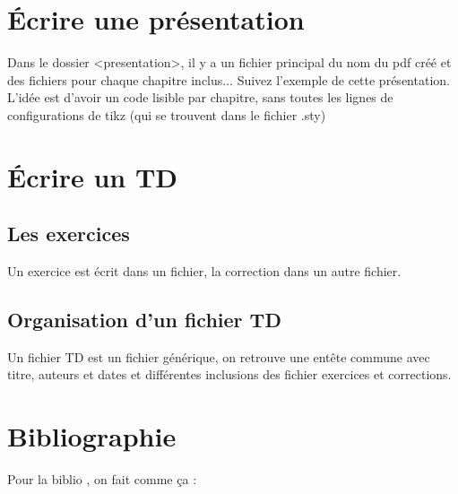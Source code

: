 \documentclass[./beamerCoursIsenLaTeX.tex]{subfiles}
\begin{document}
\section{Écrire une présentation}
\begin{frame}
 Dans le dossier <presentation>, il y a un fichier principal du nom du pdf créé et des fichiers pour chaque chapitre inclus... Suivez l'exemple de cette présentation. L'idée est d'avoir un code lisible par chapitre, sans toutes les lignes de configurations de tikz (qui se trouvent dans le fichier .sty)
\end{frame}
\section{Écrire un TD}
\subsection{Les exercices}
\begin{frame}
 Un exercice est écrit dans un fichier, la correction dans un autre fichier.
\end{frame}
\subsection{Organisation d'un fichier TD}
\begin{frame}
 Un fichier TD est un fichier générique, on retrouve une entête commune avec titre, auteurs et dates et différentes inclusions des fichier exercices et corrections.
\end{frame}
\section{Bibliographie}
\begin{frame}
 Pour la biblio \cite{Luncheonmeat,Hunger}, on fait comme ça :
 
 
\end{frame}
\end{document}
